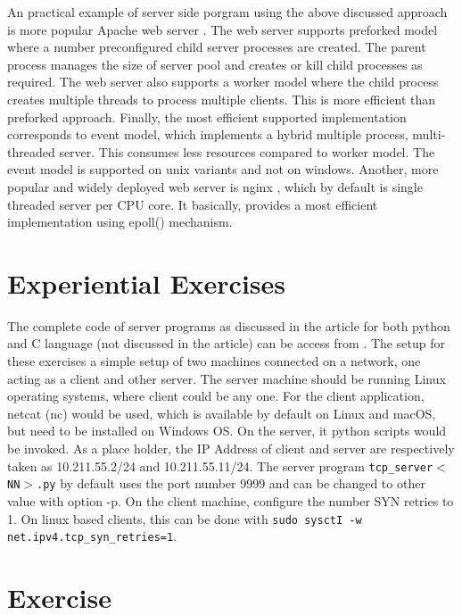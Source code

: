 \begin{multicols}{2}
An practical example of server side porgram using the above discussed approach is more popular Apache web server \cite{art1-key16}.  The web server supports preforked model where a number preconfigured child server processes are created. The parent process manages the size of server pool and creates or kill child processes as required. The web server also supports a worker model where the child process creates multiple threads to process multiple clients. This is more efficient than preforked approach. Finally, the most efficient supported implementation corresponds to event model, which implements a hybrid multiple process, multi-threaded server. This consumes less resources compared to worker model. The event model is supported on unix variants and not on windows. Another, more popular and widely deployed web server is nginx \cite{art1-key17}, which by default is single threaded server per CPU core. It basically, provides a most efficient implementation using epoll() mechanism.

\section{Experiential Exercises}

The complete code of server programs as discussed in the article for both python and C language (not discussed in the article) can be access from \cite{art1-key11}. The setup for these exercises a simple setup of two machines connected on a network, one acting as a client and other server. The server machine should be running Linux operating systems, where client could be any one. For the client application, netcat (nc) \cite{art1-key12} would be used, which is available by default on Linux and macOS, but need to be installed on Windows OS. On the server, it python scripts would be invoked. As a place holder, the IP Address of client and server are respectively taken as 10.211.55.2/24 and 10.211.55.11/24. The server program \texttt{tcp\_server$<$NN$>$.py} by default uses the port number 9999 and can be changed to other value with option -p. On the client machine, configure the number SYN retries to 1. On linux based clients, this can be done with \texttt{sudo sysctI -w net.ipv4.tcp\_syn\_retries=1}.

\setcounter{section}{0}
\section*{Exercise \label{chap1-exe01}}


\end{multicols}
